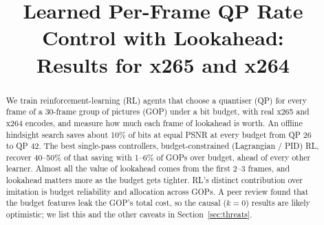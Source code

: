 \documentclass[conference,10pt]{IEEEtran}
\begin{document}
\title{Learned Per-Frame QP Rate Control with Lookahead:\\ Results for x265 and x264}
\author{
}
\maketitle

\begin{abstract}
We train reinforcement-learning (RL) agents that choose a quantiser (QP) for every frame of a 30-frame group of pictures (GOP) under a bit budget, with real x265 and x264 encodes, and measure how much each frame of lookahead is worth. An offline hindsight search saves about 10\% of bits at equal PSNR at every budget from QP 26 to QP 42. The best single-pass controllers, budget-constrained (Lagrangian / PID) RL, recover 40--50\% of that saving with 1--6\% of GOPs over budget, ahead of every other learner. Almost all the value of lookahead comes from the first 2--3 frames, and lookahead matters more as the budget gets tighter. RL's distinct contribution over imitation is budget reliability and allocation across GOPs. A peer review found that the budget features leak the GOP's total cost, so the causal ($k{=}0$) results are likely optimistic; we list this and the other caveats in Section~\ref{sec:threats}.
\end{abstract}
\end{document}
